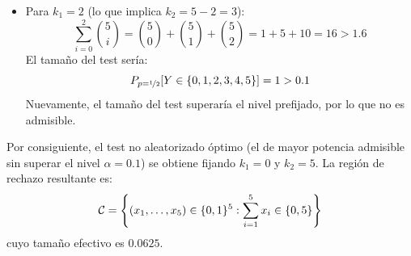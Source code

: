 \begin{ejemplo}
\begin{itemize}
        En efecto, el tamaño del test superaría el nivel prefijado, por lo que no es admisible.
        \item Para $k_1 = 2$ (lo que implica $k_2 = 5 - 2 = 3$):
        \begin{equation*}
            \sum_{i=0}^{2} \binom{5}{i} = \binom{5}{0} + \binom{5}{1} + \binom{5}{2} = 1 + 5 + 10 = 16 > 1.6
        \end{equation*}
        El tamaño del test sería:
        \begin{equation*}
            P_{p=\nicefrac{1}{2}}[Y \in \{0, 1, 2, 3, 4, 5\}] = 1 > 0.1
        \end{equation*}
        Nuevamente, el tamaño del test superaría el nivel prefijado, por lo que no es admisible.
    \end{itemize}

    Por consiguiente, el test no aleatorizado óptimo (el de mayor potencia admisible sin superar el nivel $\alpha = 0.1$) se obtiene fijando $k_1 = 0$ y $k_2 = 5$. La región de rechazo resultante es:
    \begin{equation*}
        \mathcal{C} = \left\{(x_1, \dots, x_5) \in \{0,1\}^5 : \sum_{i=1}^5 x_i \in \{0, 5\}\right\}
    \end{equation*}
    cuyo tamaño efectivo es $0.0625$.
\end{ejemplo}

